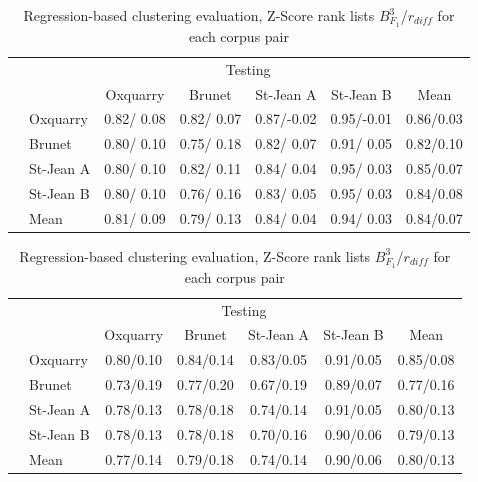 \begin{table}[H]
  \centering
  \caption{Regression-based clustering evaluation, Z-Score rank lists $B^{3}_{F_1}$/$r_{diff}$ for each corpus pair}
  \label{tab:regression-based_clustering_zscore}

  \vspace{0.5cm}

  \begin{tabular}{l l| c c c c|c}
    \toprule
    \multicolumn{2}{c}{\multirow{2}{*}{}} & \multicolumn{4}{c}{Testing} \\
    \multicolumn{2}{c}{} & Oxquarry & Brunet & St-Jean A & St-Jean B & Mean \\
    \midrule
    \parbox[!t]{2mm}{}
    & Oxquarry  & 0.82/ 0.08 & 0.82/ 0.07 & 0.87/-0.02 & 0.95/-0.01 & 0.86/0.03\\
    & Brunet    & 0.80/ 0.10 & 0.75/ 0.18 & 0.82/ 0.07 & 0.91/ 0.05 & 0.82/0.10\\
    & St-Jean A & 0.80/ 0.10 & 0.82/ 0.11 & 0.84/ 0.04 & 0.95/ 0.03 & 0.85/0.07\\
    & St-Jean B & 0.80/ 0.10 & 0.76/ 0.16 & 0.83/ 0.05 & 0.95/ 0.03 & 0.84/0.08\\
    \midrule
    & Mean      & 0.81/ 0.09 & 0.79/ 0.13 & 0.84/ 0.04 & 0.94/ 0.03 & 0.84/0.07\\
    \bottomrule
  \end{tabular}

  \vspace{0.5cm}

  \begin{tabular}{l l| c c c c|c}
    \toprule
    \multicolumn{2}{c}{\multirow{2}{*}{}} & \multicolumn{4}{c}{Testing} \\
    \multicolumn{2}{c}{} & Oxquarry & Brunet & St-Jean A & St-Jean B & Mean \\
    \midrule
    \parbox[!t]{2mm}{}
    & Oxquarry  & 0.80/0.10 & 0.84/0.14 & 0.83/0.05 & 0.91/0.05 & 0.85/0.08 \\
    & Brunet    & 0.73/0.19 & 0.77/0.20 & 0.67/0.19 & 0.89/0.07 & 0.77/0.16 \\
    & St-Jean A & 0.78/0.13 & 0.78/0.18 & 0.74/0.14 & 0.91/0.05 & 0.80/0.13 \\
    & St-Jean B & 0.78/0.13 & 0.78/0.18 & 0.70/0.16 & 0.90/0.06 & 0.79/0.13 \\
    \midrule
    & Mean      & 0.77/0.14 & 0.79/0.18 & 0.74/0.14 & 0.90/0.06 & 0.80/0.13 \\
    \bottomrule
  \end{tabular}

\end{table}
